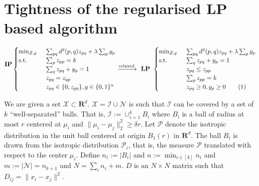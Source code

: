 \documentclass[12pt]{article}
\newcommand{\mc}{\mathcal}
\newcommand{\mb}{\mathbf}
\newcommand\numberthis{\addtocounter{equation}{1}\tag{\theequation}}
\begin{document}
\section{Tightness of the regularised LP based algorithm}
\begin{equation*}
  \begin{split}
	\textbf{IP}\\
	\textbf{}
  \end{split}
  \begin{cases}
		\min_{Z, y} \enspace &\sum_{pq}d^2(p, q)z_{pq} + \lambda \sum_p y_p\\
		\text{s.t. } \enspace &\sum_{p}z_{pp}= k\\
		& \sum_{q}z_{pq} + y_p = 1\\	
		&z_{pq} = z_{qp} \\
		& z_{pq} \in \{0, z_{pp}\}, y \in \{0, 1\}^n
	\end{cases}
	\xrightarrow{\text{relaxed}} \textbf{ LP } 
	\begin{cases}
		\min_{Z, y} \enspace &\sum_{pq}d^2(p, q)z_{pq} + \lambda \sum_p y_p\\
        \text{s.t. } &\sum_{q}z_{pq} + y_p = 1\\
		& z_{pq} \le z_{pp}\\
		& \sum_{p} z_{pp} = k\\		
		& z_{pq} \ge 0, y_p \ge 0 \numberthis\label{a-eqn:regularisedLP}
	\end{cases}
\end{equation*}

We are given a set $\mc X \subset \mb R^d$. $\mc X = \mc I \cup \mc N$ is such that $\mc I$ can be covered by a set of $k$ ``well-separated'' balls. That is, $\mc I := \cup_{i=1}^k B_i$ where $B_i$ is a ball of radius at most $r$ centered at $\mu_i$ and $\|\mu_i - \mu_j\|_{2}^{2} \ge \delta r$. Let $\mc P$ denote the isotropic distribution in the unit ball centered at origin $B_1(r)$ in $\mb R^d$. The ball $B_i$ is drawn from the isotropic distribution $\mc P_i$, that is, the measure $\mc P$ translated with respect to the center $\mu_i$. Define $n_i := |B_i|$ and $n := \min_{i\in[k]} n_i$ and $m := |\mc N| = n_{k+1}$ and $N = \sum_i n_i + m$. $D$ is an $N\times N$ matrix such that $D_{ij} = \|x_i -x_j\|^2$.
\end{document}
